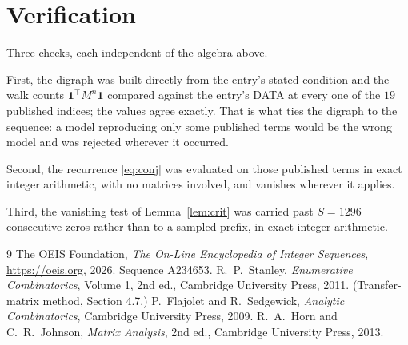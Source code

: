 \documentclass[11pt,a4paper]{article}
\theoremstyle{plain}
\theoremstyle{definition}
\begin{document}
\section{Verification}

Three checks, each independent of the algebra above.

First, the digraph was built directly from the entry's stated condition and the walk counts
$\mathbf{1}^{\!\top}M^{n}\mathbf{1}$ compared against the entry's DATA at every one of
the $19$ published indices; the values agree exactly. That is what ties the digraph to
the sequence: a model reproducing only some published terms would be the wrong model and
was rejected wherever it occurred.

Second, the recurrence \eqref{eq:conj} was evaluated on those published terms in exact
integer arithmetic, with no matrices involved, and vanishes wherever it applies.

Third, the vanishing test of Lemma~\ref{lem:crit} was carried past $S=1296$ consecutive
zeros rather than to a sampled prefix, in exact integer arithmetic.

\begin{thebibliography}{9}
 The OEIS Foundation, \emph{The On-Line Encyclopedia of Integer
Sequences}, \url{https://oeis.org}, 2026. Sequence A234653.
 R.~P.~Stanley, \emph{Enumerative Combinatorics}, Volume 1, 2nd ed.,
Cambridge University Press, 2011. (Transfer-matrix method, Section 4.7.)
 P.~Flajolet and R.~Sedgewick, \emph{Analytic Combinatorics}, Cambridge
University Press, 2009.
 R.~A.~Horn and C.~R.~Johnson, \emph{Matrix Analysis}, 2nd ed., Cambridge
University Press, 2013.
\end{thebibliography}
\end{document}
